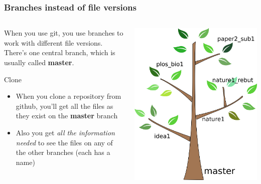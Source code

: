 \documentclass{beamer}
\begin{document}
\begin{frame}
  \frametitle{Branches instead of file versions}
  \begin{columns}[T]
    \begin{column}{.5\textwidth}
      When you use git, you use \alert{branches} to work with
      different file versions. There's one central branch, which
      is usually called \textbf{master}.
      \begin{block}{Clone}
        \begin{itemize}
        \item When you \alert{clone} a repository from github, you'll get all
          the files as they exist on the \textbf{master} branch

        \item Also you get \emph{all the information needed} to see the files
          on any of the other branches (each has a name)
        \end{itemize}
      \end{block}
    \end{column}
    \begin{column}{.5\textwidth}
      \includegraphics[width=\textwidth]{tree.png}
    \end{column}
  \end{columns}
\end{frame}
\end{document}
